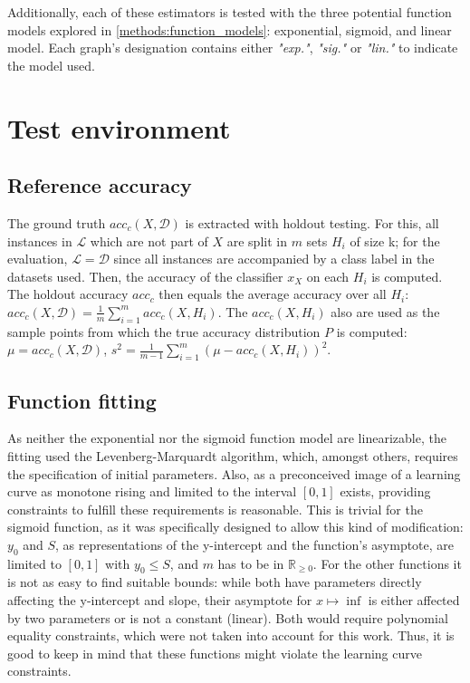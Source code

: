 Additionally, each of these estimators is tested with the three potential function models explored in \ref{methods:function_models}: exponential, sigmoid, and linear model. Each graph's designation contains either \textit{"exp."}, \textit{"sig."} or \textit{"lin."} to indicate the model used.

\section{Test environment}

\subsection{Reference accuracy}

The ground truth $acc_c(X, \mathcal{D})$ is extracted with holdout testing. For this, all instances in $\mathcal{L}$ which are not part of $X$ are split in $m$ sets $H_i$ of size k; for the evaluation, $\mathcal{L} = \mathcal{D}$ since all instances are accompanied by a class label in the datasets used. Then, the accuracy of the classifier $x_X$ on each $H_i$ is computed. The holdout accuracy $acc_c$ then equals the average accuracy over all $H_i$: $acc_c(X, \mathcal{D}) = \frac{1}{m} \sum_{i=1}^{m} acc_c(X, H_i)$. The $acc_c(X, H_i)$ also are used as the sample points from which the true accuracy distribution $P$ is computed: $\mu = acc_c(X, \mathcal{D})$, $s^2 = \frac{1}{m-1} \sum_{i=1}^{m} (\mu - acc_c(X, H_i))^2$.

\subsection{Function fitting}

As neither the exponential nor the sigmoid function model are linearizable, the fitting used the Levenberg-Marquardt algorithm, which, amongst others, requires the specification of initial parameters. Also, as a preconceived image of a learning curve as monotone rising and limited to the interval $[0, 1]$ exists, providing constraints to fulfill these requirements is reasonable. This is trivial for the sigmoid function, as it was specifically designed to allow this kind of modification: $y_0$ and $S$, as representations of the y-intercept and the function's asymptote, are limited to $[0,1]$ with $y_0 \leq S$, and $m$ has to be in $\mathbb{R}_{\geq 0}$. For the other functions it is not as easy to find suitable bounds: while both have parameters directly affecting the y-intercept and slope, their asymptote for $x \mapsto \inf$ is either affected by two parameters or is not a constant (linear). Both would require polynomial equality constraints, which were not taken into account for this work. Thus, it is good to keep in mind that these functions might violate the learning curve constraints.

